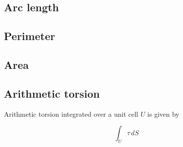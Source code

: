 
\subsection{Arc length}\label{sec:arclength}

\subsection{Perimeter}\label{sec:perimeter}

\subsection{Area}\label{sec:area}

\subsection{Arithmetic torsion}\label{sec:torsion}

Arithmetic torsion integrated over a unit cell $U$ is given by

\[
    \int_{U} \tau \, dS
\]


\newpage
